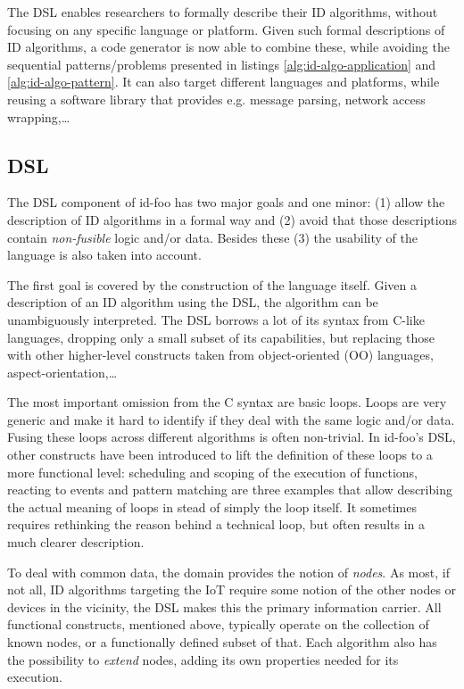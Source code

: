 \documentclass[conference]{IEEEtran}
\newcommand{\NAME}{id-foo\xspace}
\begin{document}
The DSL enables researchers to formally describe their ID algorithms, without
focusing on any specific language or platform. Given such formal descriptions
of ID algorithms, a code generator is now able to combine these, while avoiding
the sequential patterns/problems presented in listings
\ref{alg:id-algo-application} and \ref{alg:id-algo-pattern}. It can also target
different languages and platforms, while reusing a software library that
provides e.g. message parsing, network access wrapping,\dots

\subsection{DSL}

The DSL component of \NAME has two major goals and one minor: (1) allow the
description of ID algorithms in a formal way and (2) avoid that those
descriptions contain \emph{non-fusible} logic and/or data. Besides these (3)
the usability of the language is also taken into account.

The first goal is covered by the construction of the language itself. Given a
description of an ID algorithm using the DSL, the algorithm can be
unambiguously interpreted. The DSL borrows a lot of its syntax from C-like
languages, dropping only a small subset of its capabilities, but replacing
those with other higher-level constructs taken from object-oriented (OO)
languages, aspect-orientation,\dots

The most important omission from the C syntax are basic loops. Loops are very
generic and make it hard to identify if they deal with the same logic and/or
data. Fusing these loops across different algorithms is often non-trivial. In
\NAME's DSL, other constructs have been introduced to lift the definition of
these loops to a more functional level: scheduling and scoping of the execution
of functions, reacting to events and pattern matching are three examples that
allow describing the actual meaning of loops in stead of simply the loop
itself. It sometimes requires rethinking the reason behind a technical loop,
but often results in a much clearer description.

To deal with common data, the domain provides the notion of \emph{nodes}. As
most, if not all, ID algorithms targeting the IoT require some notion of the
other nodes or devices in the vicinity, the DSL makes this the primary
information carrier. All functional constructs, mentioned above, typically
operate on the collection of known nodes, or a functionally defined subset of
that. Each algorithm also has the possibility to \emph{extend} nodes, adding
its own properties needed for its execution.
\end{document}
